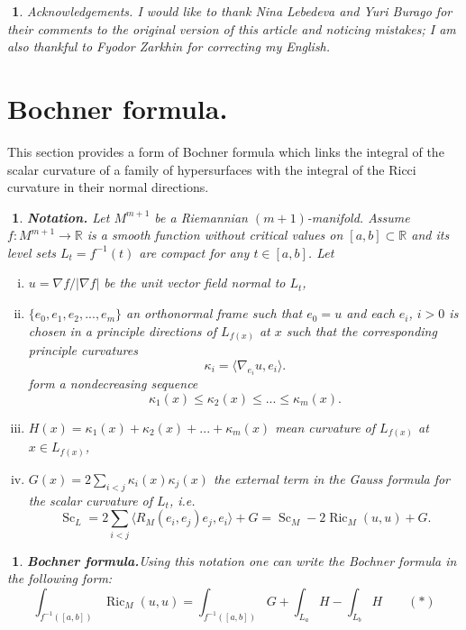 \documentclass{article}
\def\RR{\mathbb{R}}
\def\le{\leqslant}
\def\i{\subset}
\def\<{\langle}
\def\>{\rangle}
\def\Ric{\operatorname{Ric}}
\def\Sc{\operatorname{Sc}}
\newtheorem{Nothing}[thm]{$\!\!\!$}
\newenvironment{nothing}{\begin{Nothing}\rm}{\end{Nothing}}
\begin{document}
\begin{nothing}{\it Acknowledgements.}
I would like to thank Nina Lebedeva and Yuri Burago for their comments to the original version of
this article and noticing mistakes;
I am also thankful to Fyodor Zarkhin for correcting my English.
\end{nothing}

\section{Bochner formula.}

This section provides a form of Bochner formula which links the integral of
the scalar curvature of a family of hypersurfaces with the integral of the Ricci
curvature in their normal directions.

\begin{nothing}{\bf Notation.}
Let $M^{m+1}$ be a Riemannian $(m+1)$-manifold.
Assume $f:M^{m+1}\to \RR$ is a smooth function without critical values on $[a,b]\i \RR$ and its level sets $L_t=f^{-1}(t)$ are compact for any $t\in [a,b]$.
Let
\begin{enumerate}[(i)]
\item $u=\nabla f/|\nabla f|$ be the unit vector field normal to $L_t$,
\item $\{e_0,e_1,e_2,...,e_m\}$ an orthonormal frame such that $e_0=u$ and each
$e_i$, $i>0$ is chosen in a principle directions of
$L_{f(x)}$ at $x$ such that the corresponding principle curvatures
$$\kappa_i=\<\nabla_{e_i}u,e_i\>.$$
form a nondecreasing sequence
$$\kappa_1(x)\le\kappa_2(x)\le...\le\kappa_m(x).$$
\item $H(x)=\kappa_1(x)+\kappa_2(x)+...+\kappa_m(x)$ mean curvature of $L_{f(x)}$ at
$x\in L_{f(x)}$,
\item $G(x)=2\sum_{i<j}\kappa_i(x)\kappa_j(x)$ the external term in the Gauss formula
for the scalar curvature of $L_t$, i.e.
$$\Sc_{L}=2\sum_{i<j}\<R_M(e_i,e_j)e_j,e_i\>+G=\Sc_M-2\Ric_M(u,u)+G.$$
\end{enumerate}
\end{nothing}

\begin{Nothing}{\bf Bochner formula.}\label{boch} Using this notation one can write the Bochner formula in the following form:
$$\int_{f^{-1}([a,b])} \Ric_M( u, u)=\int_{f^{-1}([a,b])} G+\int_{L_a}H-\int_{L_b}H \qquad(*) $$
\end{Nothing}

\
\end{document}
